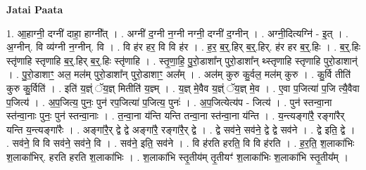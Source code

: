 \documentclass[17pt]{extarticle}
\begin{document}
\textbf{Jatai Paata} \newline

1. आ॒हाग्नी॒ दग्नी॑ दाहा॒ हाग्नी᳚त् । . अग्नी॑ द॒ग्नी न॒ग्नी नग्नी॒ दग्नी॑ द॒ग्नीन् । . अग्नी॒दित्यग्नि॑ - इ॒त् । . अ॒ग्नीन्. वि व्य॑ग्नी न॒ग्नीन्. वि । . वि ह॑र हर॒ वि वि ह॑र । . ह॒र॒ ब॒र्॒.हिर् ब॒र्॒.हिर्. ह॑र हर ब॒र्॒.हिः । . ब॒र्॒.हिः स्तृ॑णाहि स्तृणाहि ब॒र्॒.हिर् ब॒र्॒.हिः स्तृ॑णाहि । . स्तृ॒णा॒हि॒ पु॒रो॒डाशा᳚न् पुरो॒डाशा᳚न् थ्स्तृणाहि स्तृणाहि पुरो॒डाशान्॑ । . पु॒रो॒डाशाꣳ॒॒ अल॒ मल॑म् पुरो॒डाशा᳚न् पुरो॒डाशाꣳ॒॒ अल᳚म् । . अल॑म् कुरु कु॒र्वल॒ मल॑म् कुरु । . कु॒र्वि तीति॑ कुरु कु॒र्विति॑ । . इति॑ य॒ज्ञ्ं ॅय॒ज्ञ् मितीति॑ य॒ज्ञ्म् । . य॒ज्ञ् मे॒वैव य॒ज्ञ्ं ॅय॒ज्ञ् मे॒व । . ए॒वा प॒जित्या॑ प॒जि त्यै॒वैवा प॒जित्य॑ । . अ॒प॒जित्य॒ पुनः॒ पुन॑ रप॒जित्या॑ प॒जित्य॒ पुनः॑ । . अ॒प॒जित्येत्य॑प - जित्य॑ । . पुन॑ स्तन्वा॒ना स्त॑न्वा॒नाः पुनः॒ पुन॑ स्तन्वा॒नाः । . त॒न्वा॒ना य॑न्ति यन्ति तन्वा॒ना स्त॑न्वा॒ना य॑न्ति । . य॒न्त्यङ्गा॑रै॒ रङ्गा॑रैर् यन्ति य॒न्त्यङ्गा॑रैः । . अङ्गा॑रै॒र् द्वे द्वे अङ्गा॑रै॒ रङ्गा॑रै॒र् द्वे । . द्वे सव॑ने॒ सव॑ने॒ द्वे द्वे सव॑ने । . द्वे इति॒ द्वे । . सव॑ने॒ वि वि सव॑ने॒ सव॑ने॒ वि । . सव॑ने॒ इति॒ सव॑ने । . वि ह॑रति हरति॒ वि वि ह॑रति । . ह॒र॒ति॒ श॒लाका॑भिः श॒लाका॑भिर्. हरति हरति श॒लाका॑भिः । . श॒लाका॑भि स्तृ॒तीय॑म् तृ॒तीयꣳ॑ श॒लाका॑भिः श॒लाका॑भि स्तृ॒तीय᳚म् । \newline
\end{document}
